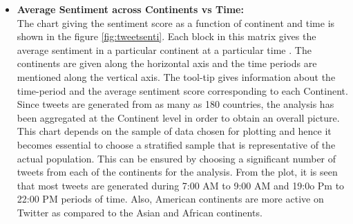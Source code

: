 \documentclass[9pt,twocolumn,twoside]{styles/osajnl}
\begin{document}
\begin{itemize}
    \item \textbf{Average Sentiment across Continents vs Time:}\\
    The chart giving the sentiment score as a function of continent and time is shown in the figure \ref{fig:tweetsenti}. Each block in this matrix gives the average sentiment in a particular continent at a particular time \cite{www-contisenti}. The continents are given along the horizontal axis and the time periods are mentioned along the vertical axis. The tool-tip gives information about the time-period and the average sentiment score corresponding to each Continent. Since tweets are generated from as many as 180 countries, the analysis has been aggregated at the Continent level in order to obtain an overall picture. This chart depends on the sample of data chosen for plotting and hence it becomes essential to choose a stratified sample that is representative of the actual population. This can be ensured by choosing a significant number of tweets from each of the continents for the analysis. From the plot, it is seen that most tweets are generated during 7:00 AM to 9:00 AM and 19:0o Pm to 22:00 PM periods of time. Also, American continents are more active on Twitter as compared to the Asian and African continents. 
\end{itemize}
\end{document}
